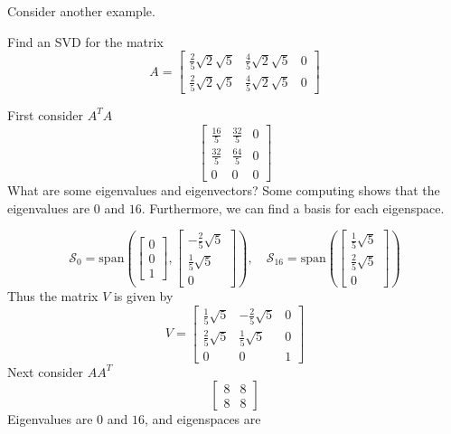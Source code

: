 \documentclass{ximera}
\begin{document}
Consider another example.

\begin{example}\label{SVDanother2x3}
Find an SVD for the matrix
\begin{equation*}
A= \left[
\begin{array}{ccc}
\frac{2}{5}\sqrt{2}\sqrt{5} & \frac{4}{5}\sqrt{2}\sqrt{5} & 0 \\
\frac{2}{5}\sqrt{2}\sqrt{5} & \frac{4}{5}\sqrt{2}\sqrt{5} & 0
\end{array}
\right]
\end{equation*}

\begin{explanation}
First consider $A^TA$
\begin{equation*}
\left[
\begin{array}{ccc}
\frac{16}{5} & \frac{32}{5} & 0 \\
\frac{32}{5} & \frac{64}{5} & 0 \\
0 & 0 & 0
\end{array}
\right]
\end{equation*}
What are some eigenvalues and eigenvectors? Some computing shows that the eigenvalues are $0$ and $16$.  Furthermore, we can find a basis for each eigenspace.

\begin{equation*}
\mathcal{S}_0=\mbox{span}\left( \left[
\begin{array}{c}
0 \\
0 \\
1
\end{array}
\right] ,\left[  
\begin{array}{c}
-\frac{2}{5}\sqrt{5} \\
\frac{1}{5}\sqrt{5} \\
0
\end{array}
\right] \right),
\quad\mathcal{S}_{16}=\mbox{span}\left( \left[  
\begin{array}{c}
\frac{1}{5}\sqrt{5} \\
\frac{2}{5}\sqrt{5} \\
0
\end{array}
\right] \right) 
\end{equation*}
Thus the matrix $V$ is given by
\begin{equation*}
V=\left[
\begin{array}{ccc}
\frac{1}{5}\sqrt{5} & -\frac{2}{5}\sqrt{5} & 0 \\
\frac{2}{5}\sqrt{5} & \frac{1}{5}\sqrt{5} & 0 \\
0 & 0 & 1
\end{array}
\right]
\end{equation*}
Next consider $AA^T$
\begin{equation*}
\left[
\begin{array}{cc}
8 & 8 \\
8 & 8
\end{array}
\right]
\end{equation*}
Eigenvalues are $0$ and $16$, and eigenspaces are


\end{explanation}
\end{example}
\end{document}
